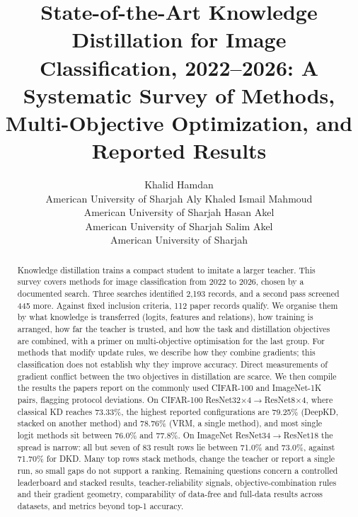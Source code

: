 \documentclass[10pt]{article}
\title{State-of-the-Art Knowledge Distillation for Image Classification, 2022--2026:
A Systematic Survey of Methods, Multi-Objective Optimization, and Reported Results}
\author{\name Khalid Hamdan \\ \addr American University of Sharjah
  \AND \name Aly Khaled Ismail Mahmoud \\ \addr American University of Sharjah
  \AND \name Hasan Akel \\ \addr American University of Sharjah
  \AND \name Salim Akel \\ \addr American University of Sharjah}
\begin{document}
\maketitle

\begin{abstract}
Knowledge distillation trains a compact student to imitate a larger teacher. This survey covers methods for
image classification from 2022 to 2026, chosen by a documented search.
Three searches identified 2,193 records, and a second pass screened 445 more. Against fixed inclusion criteria,
112 paper records qualify. We organise them by what knowledge is transferred (logits, features and relations), how
training is arranged, how far the teacher is trusted, and how the task and distillation objectives are
combined, with a primer on multi-objective optimisation for the last group. For methods that modify update rules, we describe how they combine gradients; this classification does not establish why they improve accuracy. Direct measurements
of gradient conflict between the two objectives in distillation are scarce. We then compile the results the
papers report on the commonly used CIFAR-100 and ImageNet-1K pairs, flagging protocol deviations. On CIFAR-100 ResNet32$\times$4$\to$ResNet8$\times$4,
where classical KD reaches 73.33\%, the highest reported configurations are 79.25\% (DeepKD, stacked on
another method) and 78.76\% (VRM, a single method), and most single logit methods sit between 76.0\% and
77.8\%. On ImageNet ResNet34$\to$ResNet18 the spread is narrow: all but seven of 83 result rows lie between 71.0\%
and 73.0\%, against 71.70\% for DKD. Many top rows stack methods, change the teacher or report a single run,
so small gaps do not support a ranking. Remaining questions concern a controlled leaderboard and stacked
results, teacher-reliability signals, objective-combination rules and their gradient geometry, comparability of data-free and full-data results across datasets, and metrics beyond top-1 accuracy.
\end{abstract}















\end{document}
